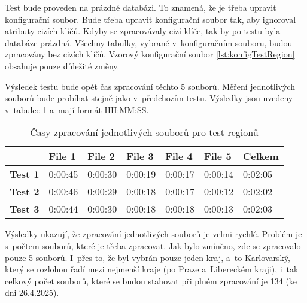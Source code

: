 Test bude proveden na prázdné databázi. To znamená, že je třeba upravit konfigurační soubor.
Bude třeba upravit konfigurační soubor tak, aby ignoroval atributy cizích klíčů.
Kdyby se zpracovávaly cizí klíče, tak by po testu byla databáze prázdná.
Všechny tabulky, vybrané v~konfiguračním souboru, budou zpracovány bez cizích klíčů.
Vzorový konfigurační soubor \ref{lst:konfigTestRegion} obsahuje pouze důležité změny.

Výsledek testu bude opět čas zpracování těchto 5 souborů.
Měření jednotlivých souborů bude probíhat stejně jako v~předchozím testu.
Výsledky jsou uvedeny v~tabulce \ref{tab:test2} a~mají formát HH:MM:SS.

\begin{table}[!h]
  \centering
  \caption{Časy zpracování jednotlivých souborů pro test regionů}
  \label{tab:test2}
  \begin{tabular}{|l|l|l|l|l|l|l|}
  \hline
                  & \textbf{File 1} & \textbf{File 2} & \textbf{File 3} & \textbf{File 4} & \textbf{File 5} & \textbf{Celkem} \\ \hline
  \textbf{Test 1} & 0:00:45         & 0:00:30         & 0:00:19         & 0:00:17         & 0:00:14         & 0:02:05         \\ \hline
  \textbf{Test 2} & 0:00:46         & 0:00:29         & 0:00:18         & 0:00:17         & 0:00:12         & 0:02:02         \\ \hline
  \textbf{Test 3} & 0:00:44         & 0:00:30         & 0:00:18         & 0:00:18         & 0:00:13         & 0:02:03         \\ \hline
  \end{tabular}
\end{table}

Výsledky ukazují, že zpracování jednotlivých souborů je velmi rychlé.
Problém je s~počtem souborů, které je třeba zpracovat. Jak bylo zmíněno,
zde se zpracovalo pouze 5 souborů. I~přes to, že byl vybrán pouze jeden kraj,
a~to Karlovarský, který se rozlohou řadí mezi nejmenší kraje (po Praze a~Libereckém kraji),
i~tak celkový počet souborů, které se budou stahovat při plném zpracování je 134 (ke dni 26.4.2025).

\newpage

